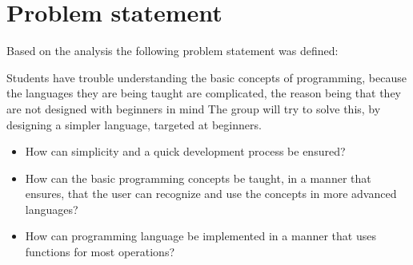 \newpage
\section{Problem statement}
Based on the analysis the following problem statement was defined:
\begin{center}
	Students have trouble understanding the basic concepts of programming, because the languages they are being taught are complicated, the reason being that they are not designed with beginners in mind
	The group will try to solve this, by designing a simpler language, targeted at beginners.

\begin{itemize}
	\item How can simplicity and a quick development process be ensured?
	\item How can the basic programming concepts be taught, in a manner that ensures, that the user can recognize and use the concepts in more advanced languages?
	\item How can programming language be implemented in a manner that uses functions for most operations? 
\end{itemize}
\end{center}

